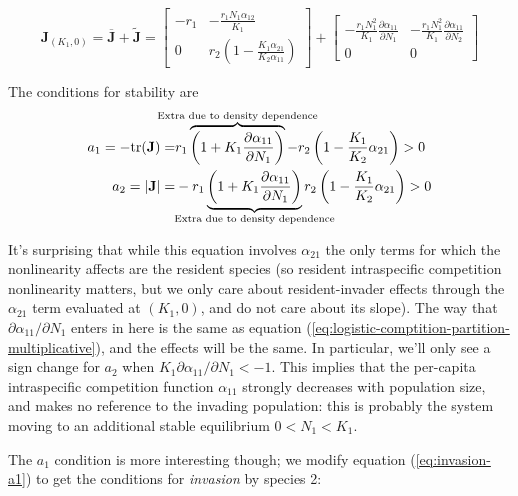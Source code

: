 \documentclass[12pt,a4paper]{article}
\newcommand{\tr}{\mathrm{tr}}
\begin{document}
\begin{equation}
  \mathbf{J}_{(K_1, 0)} = 
  \overline{\mathbf{J}} + \widetilde{\mathbf{J}} = 
  \begin{bmatrix}
    -r_1&
    -\frac{r_1N_1\alpha_{12}}{K_1}\\
    0&
    r_2\left(1  - \frac{K_1\alpha_{21}}{K_2\alpha_{11}}\right)
  \end{bmatrix}
  +
  \begin{bmatrix}
    -\frac{r_1 N_1^2}{K_1} \frac{\partial \alpha_{11}}{\partial N_1}
    &
    -\frac{r_1 N_1^2}{K_1} \frac{\partial \alpha_{11}}{\partial N_2}
    \\0&0
  \end{bmatrix}
\end{equation}

The conditions for stability are
%
\begin{equation*}
  \begin{split}
    a_1 = - \tr(\mathbf{J}) =& 
    r_1\overbrace{\left(1 +
        K_1 \frac{\partial
          \alpha_{11}}{\partial N_1}
      \right)}^{\mathclap{\text{Extra due to density dependence}}} -
    r_2\left(1  - \frac{K_1}{K_2}\alpha_{21}\right)
    > 0\\
    a_2 = |\mathbf{J}| =&
    -r_1\underbrace{\left(1 + K_1
        \frac{\partial \alpha_{11}}{\partial N_1}\right)}%
    _{\mathclap{\text{Extra due to density dependence}}}
    r_2\left(1  - \frac{K_1}{K_2}\alpha_{21}\right)
    > 0
  \end{split}
\end{equation*}

It's surprising that while this equation involves $\alpha_{21}$ the
only terms for which the nonlinearity affects are the resident species
(so resident intraspecific competition nonlinearity matters, but we
only care about resident-invader effects through the $\alpha_{21}$
term evaluated at $(K_1, 0)$, and do not care about its slope).  The
way that $\partial\alpha_{11}/\partial N_1$ enters in here is the same
as equation (\ref{eq:logistic-comptition-partition-multiplicative}),
and the effects will be the same.  In particular, we'll only see a
sign change for $a_2$ when $K_1\partial\alpha_{11}/\partial N_1 < -1$.
This implies that the per-capita intraspecific competition function
$\alpha_{11}$ strongly decreases with population size, and makes no
reference to the invading population: this is probably the system
moving to an additional stable equilibrium $0 < N_1 < K_1$.

The $a_1$ condition is more interesting though; we modify equation
(\ref{eq:invasion-a1}) to get the conditions for \textit{invasion} by
species 2:
\end{document}
